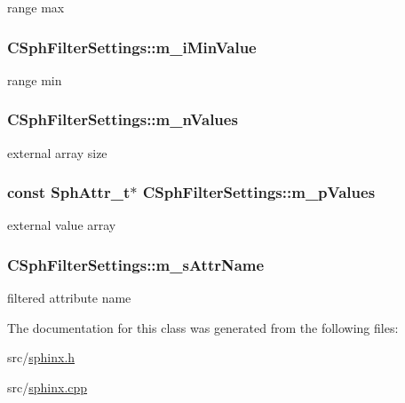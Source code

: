 range max 

\hypertarget{classCSphFilterSettings_a473a0111b04baca34aecf66dda543457}{
\subsubsection[{m\-\_\-i\-Min\-Value}]{ C\-Sph\-Filter\-Settings\-::m\-\_\-i\-Min\-Value}}\label{classCSphFilterSettings_a473a0111b04baca34aecf66dda543457}


range min 

\hypertarget{classCSphFilterSettings_a24cf7c8652d45573747ce5b11e727681}{
\subsubsection[{m\-\_\-n\-Values}]{ C\-Sph\-Filter\-Settings\-::m\-\_\-n\-Values\hspace{0.3cm}{\ttfamily [protected]}}}\label{classCSphFilterSettings_a24cf7c8652d45573747ce5b11e727681}


external array size 

\hypertarget{classCSphFilterSettings_a09a650d5454c6c53380ab6dd37289d9f}{
\subsubsection[{m\-\_\-p\-Values}]{\setlength{\rightskip}{0pt plus 5cm}const {\bf Sph\-Attr\-\_\-t}$\ast$ C\-Sph\-Filter\-Settings\-::m\-\_\-p\-Values\hspace{0.3cm}{\ttfamily [protected]}}}\label{classCSphFilterSettings_a09a650d5454c6c53380ab6dd37289d9f}


external value array 

\hypertarget{classCSphFilterSettings_a44521197066f8647769ba3a0aae69ff0}{
\subsubsection[{m\-\_\-s\-Attr\-Name}]{ C\-Sph\-Filter\-Settings\-::m\-\_\-s\-Attr\-Name}}\label{classCSphFilterSettings_a44521197066f8647769ba3a0aae69ff0}


filtered attribute name 



The documentation for this class was generated from the following files\-:\begin{DoxyCompactItemize}
\item 
src/\hyperlink{sphinx_8h}{sphinx.\-h}\item 
src/\hyperlink{sphinx_8cpp}{sphinx.\-cpp}\end{DoxyCompactItemize}
